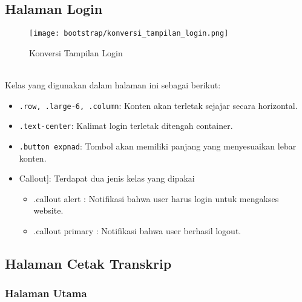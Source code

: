 \subsection{Halaman Login}
\begin{figure} [H]
	\centering  
	\texttt{[image: bootstrap/konversi\_tampilan\_login.png]}  
	\caption{Konversi Tampilan Login} 
\end{figure} \noindent \\
Kelas yang digunakan dalam halaman ini sebagai berikut:
\begin{itemize}
	\item \texttt{.row, .large-6, .column}: Konten akan terletak sejajar secara horizontal.
	\item \texttt{.text-center}: Kalimat login terletak ditengah container.
	\item \texttt{.button expnad}: Tombol akan memiliki panjang yang menyesuaikan lebar konten.
	\item Callout]: Terdapat dua jenis kelas yang dipakai
	\begin{itemize}
		\item.callout alert	: Notifikasi bahwa user harus login untuk mengakses website.
		\item.callout primary	: Notifikasi bahwa user berhasil logout.
	\end{itemize}
	
\end{itemize}

\subsection{Halaman Cetak Transkrip}
\subsubsection{Halaman Utama}


